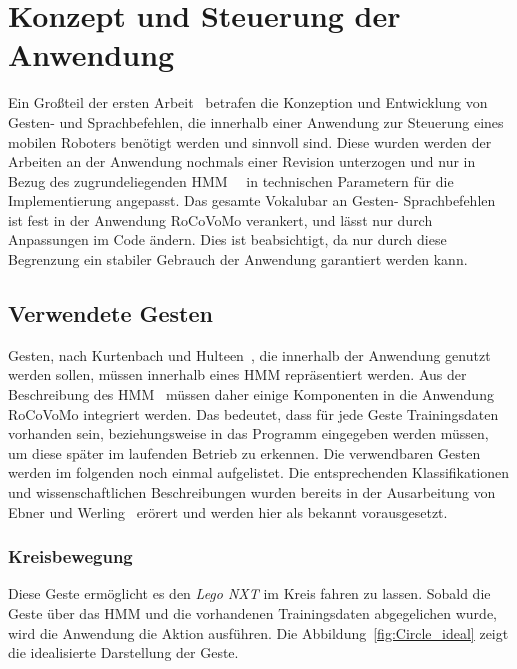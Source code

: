 \chapter{Konzept und Steuerung der Anwendung}
\label{chap:Konzept}

Ein Gro\ss teil der ersten Arbeit~\cite{bib:Ebner_Werling} betrafen die Konzeption und Entwicklung von Gesten- und Sprachbefehlen, die innerhalb einer Anwendung zur Steuerung eines mobilen Roboters ben\"otigt werden und sinnvoll sind. Diese wurden werden der Arbeiten an der Anwendung nochmals einer Revision unterzogen und nur in Bezug des zugrundeliegenden \gls{HMM}~\cite{bib:hmmbaum}~\cite{bib:hmmrabiner} in technischen Parametern f\"ur die Implementierung angepasst.
\newline
Das gesamte Vokalubar an Gesten- Sprachbefehlen ist fest in der Anwendung RoCoVoMo verankert, und l\"asst nur durch Anpassungen im Code \"andern. Dies ist beabsichtigt, da nur durch diese Begrenzung ein stabiler Gebrauch der Anwendung garantiert werden kann.

\section{Verwendete Gesten}
Gesten, nach Kurtenbach und Hulteen~\cite{bib:kurtenbach}, die innerhalb der Anwendung genutzt werden sollen, m\"ussen innerhalb eines \gls{HMM} repr\"asentiert werden. Aus der Beschreibung des \gls{HMM}~\cite{bib:Ebner_Werling} m\"ussen daher einige Komponenten in die Anwendung RoCoVoMo integriert werden. Das bedeutet, dass f\"ur jede Geste Trainingsdaten vorhanden sein, beziehungsweise in das Programm eingegeben werden m\"ussen, um diese sp\"ater im laufenden Betrieb zu erkennen.
\newline
Die verwendbaren Gesten werden im folgenden noch einmal aufgelistet. Die entsprechenden Klassifikationen und wissenschaftlichen Beschreibungen wurden bereits in der Ausarbeitung von Ebner und Werling~\cite{bib:Ebner_Werling} er\"orert und werden hier als bekannt vorausgesetzt.

\subsection{Kreisbewegung}
Diese Geste erm\"oglicht es den \textit{Lego NXT} im Kreis fahren zu lassen. Sobald die Geste \"uber das \gls{HMM} und die vorhandenen Trainingsdaten abgegelichen wurde, wird die Anwendung die Aktion ausf\"uhren. Die Abbildung~\ref{fig:Circle_ideal} zeigt die idealisierte Darstellung der Geste.

